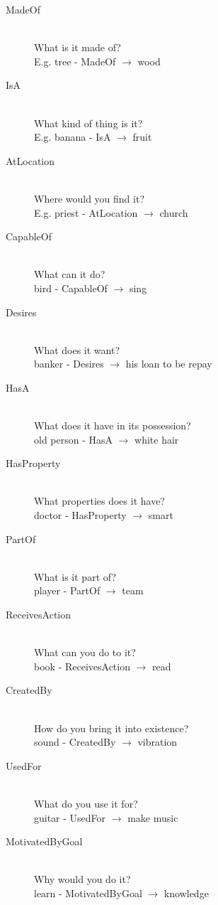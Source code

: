 \begin{description}
\item[MadeOf] \hfill \\ What is it made of? \hfill \\ E.g. tree - MadeOf $\rightarrow$ wood
\item[IsA] \hfill \\ What kind of thing is it? \hfill \\ E.g. banana - IsA $\rightarrow$ fruit
\item[AtLocation] \hfill \\ Where would you find it? \hfill \\ E.g. priest - AtLocation $\rightarrow$ church
\item[CapableOf] \hfill \\ What can it do? \hfill \\ bird - CapableOf $\rightarrow$ sing
\item[Desires] \hfill \\ What does it want? \hfill \\ banker - Desires $\rightarrow$ his loan to be repay
\item[HasA] \hfill \\ What does it have in its possession? \hfill \\ old person - HasA $\rightarrow$ white hair
\item[HasProperty] \hfill \\ What properties does it have? \hfill \\ doctor - HasProperty $\rightarrow$ smart
\item[PartOf] \hfill \\ What is it part of? \hfill \\ player - PartOf $\rightarrow$ team
\item[ReceivesAction] \hfill \\What can you do to it? \hfill \\ book - ReceivesAction $\rightarrow$ read
\item[CreatedBy] \hfill \\ How do you bring it into existence? \hfill \\ sound - CreatedBy $\rightarrow$ vibration
\item[UsedFor] \hfill \\ What do you use it for? \hfill \\ guitar - UsedFor $\rightarrow$ make music
\item[MotivatedByGoal] \hfill \\ Why would you do it? \hfill \\ learn - MotivatedByGoal $\rightarrow$ knowledge
\end{description}

